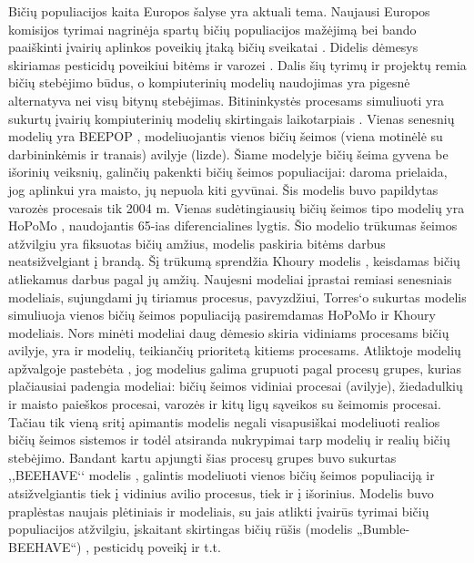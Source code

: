 \documentclass{VUMIFPSmagistrinis}
\begin{document}

Bičių populiacijos kaita Europos šalyse \cite{LHC16} yra aktuali tema. Naujausi Europos komisijos tyrimai nagrinėja spartų bičių populiacijos mažėjimą bei bando paaiškinti įvairių aplinkos poveikių įtaką bičių sveikatai \cite{EFSA17a}. Didelis dėmesys skiriamas pesticidų poveikiui bitėms \cite{EFSA18} ir varozei \cite{EFSA17a}.  Dalis šių tyrimų ir projektų remia bičių stebėjimo būdus, o kompiuterinių modelių naudojimas yra pigesnė alternatyva nei visų bitynų stebėjimas. 
Bitininkystės procesams simuliuoti yra sukurtų įvairių kompiuterinių modelių skirtingais laikotarpiais \cite{BTO13}. Vienas senesnių modelių yra BEEPOP \cite{DRL89}, modeliuojantis vienos bičių šeimos (viena motinėlė su darbininkėmis ir tranais) avilyje (lizde). Šiame modelyje bičių šeima gyvena be išorinių veiksnių, galinčių pakenkti bičių šeimos populiacijai: daroma prielaida, jog aplinkui yra maisto, jų nepuola kiti gyvūnai. Šis modelis buvo papildytas varozės procesais \cite{HoC05} tik 2004 m. Vienas sudėtingiausių bičių šeimos tipo modelių yra HoPoMo \cite{ScC07}, naudojantis 65-ias diferencialines lygtis. Šio modelio trūkumas šeimos atžvilgiu yra fiksuotas bičių amžius, modelis paskiria bitėms darbus neatsižvelgiant į brandą. Šį trūkumą sprendžia Khoury modelis \cite{KBM13}, keisdamas bičių atliekamus darbus pagal jų amžių. Naujesni modeliai įprastai remiasi senesniais modeliais, sujungdami jų tiriamus procesus, pavyzdžiui, Torres‘o \cite{TRR15} sukurtas modelis simuliuoja vienos bičių šeimos populiaciją pasiremdamas HoPoMo ir Khoury modeliais. 
Nors minėti modeliai daug dėmesio skiria vidiniams procesams bičių avilyje, yra ir modelių, teikiančių prioritetą kitiems procesams. Atliktoje modelių apžvalgoje pastebėta \cite{BTO13}, jog modelius galima grupuoti pagal procesų grupes, kurias plačiausiai padengia modeliai: bičių šeimos vidiniai procesai (avilyje), žiedadulkių ir maisto paieškos procesai, varozės ir kitų ligų sąveikos su šeimomis procesai. Tačiau tik vieną sritį apimantis modelis negali visapusiškai modeliuoti realios bičių šeimos sistemos ir todėl atsiranda nukrypimai tarp modelių ir realių bičių stebėjimo. Bandant kartu apjungti šias procesų grupes buvo sukurtas ,,BEEHAVE‘‘ modelis \cite{BGT14}, galintis modeliuoti vienos bičių šeimos populiaciją ir atsižvelgiantis tiek į vidinius avilio procesus, tiek ir į išorinius. Modelis buvo praplėstas naujais plėtiniais ir modeliais, su jais atlikti įvairūs tyrimai bičių populiacijos atžvilgiu, įskaitant skirtingas bičių rūšis (modelis „Bumble-BEEHAVE“) \cite{BDP18}, pesticidų poveikį \cite{RBT17} ir t.t.
\end{document}
